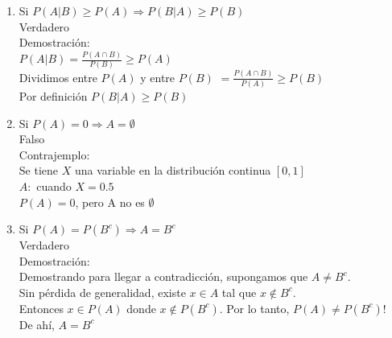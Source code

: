 \documentclass[12pt,a4paper]{report}
\begin{document}
\begin{enumerate}
{\begin{enumerate}[label=\alph*) ]
{	Verdadero\\

	Demostración:\\
	Sabemos que $P(A|B) \subseteq$ P(A), ya que $(A \cap B) \subseteq A$\\
	Usando el teorema visto en clase:
	(Si $A, B \in F$ tal que $A \subseteq B \Rightarrow P(A) \leq P(B)$)\\
	Tenemos que $P(A|B) \leq P(A)$\\

	}

	\item{Si $P(A|B) \geq P(A) \Rightarrow P(B|A)\geq P(B)$\\

	Verdadero\\

	Demostración:\\
	$P(A|B) = \frac{P(A \cap B)}{P(B)} \geq P(A)$\\
	Dividimos entre $P(A)$ y entre $P(B)$
	$ = \frac{P(A \cap B)}{P(A)} \geq P(B)$ \\
	Por definición
	$P(B|A) \geq P(B)$\\

	}

	\item{Si $P(A)=0 \Rightarrow A= \emptyset$ \\

	Falso\\

	Contrajemplo:\\
	Se tiene $X$ una variable en la distribución continua $[0,1]$\\
	$A:$ cuando $X = 0.5$\\
	$P(A)=0$, pero A no es $\emptyset$\\
	}

	\item{Si $P(A)=P(B^c) \Rightarrow A=B^c$}\\

	Verdadero\\

	Demostración:\\
	Demostrando para llegar a contradicción, supongamos que $A \neq B^c$.\\
	Sin pérdida de generalidad, existe $x \in A$ tal que $x \not\in B^c$.\\
	Entonces ${x} \in P(A)$ donde ${x} \not\in P(B^c)$. Por lo tanto, $P(A) \neq P(B^c)$!\\
	De ahí, $A = B^c$\\


\end{enumerate}}
\end{enumerate}
\end{document}
